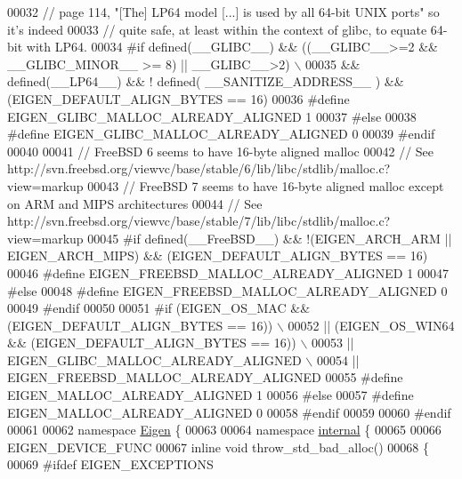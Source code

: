 \begin{DoxyCode}
{00032 \textcolor{comment}{// page 114, "[The] LP64 model [...] is used by all 64-bit UNIX ports" so it's indeed}
00033 \textcolor{comment}{// quite safe, at least within the context of glibc, to equate 64-bit with LP64.}
00034 \textcolor{preprocessor}{#if defined(\_\_GLIBC\_\_) && ((\_\_GLIBC\_\_>=2 && \_\_GLIBC\_MINOR\_\_ >= 8) || \_\_GLIBC\_\_>2) \(\backslash\)}
00035 \textcolor{preprocessor}{ && defined(\_\_LP64\_\_) && ! defined( \_\_SANITIZE\_ADDRESS\_\_ ) && (EIGEN\_DEFAULT\_ALIGN\_BYTES == 16)}
00036 \textcolor{preprocessor}{  #define EIGEN\_GLIBC\_MALLOC\_ALREADY\_ALIGNED 1}
00037 \textcolor{preprocessor}{#else}
00038 \textcolor{preprocessor}{  #define EIGEN\_GLIBC\_MALLOC\_ALREADY\_ALIGNED 0}
00039 \textcolor{preprocessor}{#endif}
00040 
00041 \textcolor{comment}{// FreeBSD 6 seems to have 16-byte aligned malloc}
00042 \textcolor{comment}{//   See http://svn.freebsd.org/viewvc/base/stable/6/lib/libc/stdlib/malloc.c?view=markup}
00043 \textcolor{comment}{// FreeBSD 7 seems to have 16-byte aligned malloc except on ARM and MIPS architectures}
00044 \textcolor{comment}{//   See http://svn.freebsd.org/viewvc/base/stable/7/lib/libc/stdlib/malloc.c?view=markup}
00045 \textcolor{preprocessor}{#if defined(\_\_FreeBSD\_\_) && !(EIGEN\_ARCH\_ARM || EIGEN\_ARCH\_MIPS) && (EIGEN\_DEFAULT\_ALIGN\_BYTES == 16)}
00046 \textcolor{preprocessor}{  #define EIGEN\_FREEBSD\_MALLOC\_ALREADY\_ALIGNED 1}
00047 \textcolor{preprocessor}{#else}
00048 \textcolor{preprocessor}{  #define EIGEN\_FREEBSD\_MALLOC\_ALREADY\_ALIGNED 0}
00049 \textcolor{preprocessor}{#endif}
00050 
00051 \textcolor{preprocessor}{#if (EIGEN\_OS\_MAC && (EIGEN\_DEFAULT\_ALIGN\_BYTES == 16))     \(\backslash\)}
00052 \textcolor{preprocessor}{ || (EIGEN\_OS\_WIN64 && (EIGEN\_DEFAULT\_ALIGN\_BYTES == 16))   \(\backslash\)}
00053 \textcolor{preprocessor}{ || EIGEN\_GLIBC\_MALLOC\_ALREADY\_ALIGNED              \(\backslash\)}
00054 \textcolor{preprocessor}{ || EIGEN\_FREEBSD\_MALLOC\_ALREADY\_ALIGNED}
00055 \textcolor{preprocessor}{  #define EIGEN\_MALLOC\_ALREADY\_ALIGNED 1}
00056 \textcolor{preprocessor}{#else}
00057 \textcolor{preprocessor}{  #define EIGEN\_MALLOC\_ALREADY\_ALIGNED 0}
00058 \textcolor{preprocessor}{#endif}
00059 
00060 \textcolor{preprocessor}{#endif}
00061 
00062 \textcolor{keyword}{namespace }\hyperlink{namespace_eigen}{Eigen} \{
00063 
00064 \textcolor{keyword}{namespace }\hyperlink{namespaceinternal}{internal} \{
00065 
00066 EIGEN\_DEVICE\_FUNC 
00067 \textcolor{keyword}{inline} \textcolor{keywordtype}{void} throw\_std\_bad\_alloc()
00068 \{
00069 \textcolor{preprocessor}{  #ifdef EIGEN\_EXCEPTIONS}
}
\end{DoxyCode}
